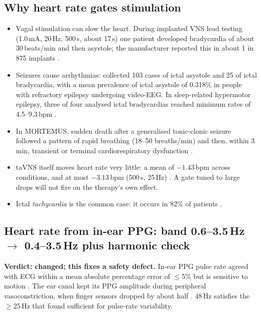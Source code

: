 \documentclass[10pt,a4paper]{article}
\newcommand{\us}{\texorpdfstring{\,\textmu s}{ us}}
\newcommand{\becomes}{\texorpdfstring{$\rightarrow$}{to}}
\begin{document}
\subsection{Why heart rate gates stimulation}
\begin{itemize}
  \item Vagal stimulation can slow the heart. During implanted VNS lead testing (1.0\,mA, 20\,Hz, 500\us, about 17\,s)
        one patient developed bradycardia of about 30\,beats/min and then asystole; the manufacturer reported this in
        about 1 in 875 implants \parencite{asconape1999}.
  \item Seizures cause arrhythmias: \textcite{vanderlende2016} collected 103 cases of ictal asystole and 25 of ictal
        bradycardia, with a mean prevalence of ictal asystole of 0.318\% in people with refractory epilepsy undergoing
        video-EEG. In sleep-related hypermotor epilepsy, three of four analysed ictal bradycardias reached minimum rates
        of 4.5--9.3\,bpm \parencite{muccioli2024}.
  \item In MORTEMUS, sudden death after a generalised tonic-clonic seizure followed a pattern of rapid breathing
        (18--50 breaths/min) and then, within 3\,min, transient or terminal cardiorespiratory dysfunction
        \parencite{ryvlin2013}.
  \item taVNS itself moves heart rate very little: a mean of $-1.43$\,bpm across conditions, and at most $-3.13$\,bpm
        (500\us, 25\,Hz) \parencite{badran2018}. A gate tuned to large drops will not fire on the therapy's own effect.
  \item Ictal \emph{tachycardia} is the common case: it occurs in 82\% of patients \parencite{eggleston2014}.
\end{itemize}

\subsection{Heart rate from in-ear PPG: band 0.6--3.5\,Hz \becomes{} 0.4--3.5\,Hz plus harmonic check}\label{sec:ppg}
\textbf{Verdict: changed; this fixes a safety defect.} In-ear PPG pulse rate agreed with ECG within a mean absolute
percentage error of $\le$5\% but is sensitive to motion \parencite{passler2019}. The ear canal kept its PPG amplitude
during peripheral vasoconstriction, when finger sensors dropped by about half \parencite{budidha2014}. 48\,Hz satisfies
the $\ge$25\,Hz that \textcite{choi2017} found sufficient for pulse-rate variability.
\end{document}
